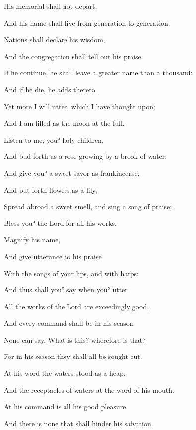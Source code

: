 {\par }{\Q His memorial shall not depart,
\par }{\Q And his name shall live from generation to generation.
\par }{\Q {}Nations shall declare his wisdom,
\par }{\Q And the congregation shall tell out his praise.
\par }{\Q {}If he continue, he shall leave a greater name than a thousand:
\par }{\Q And if he
 die, he adds thereto.
\par }{\BB \par }{\Q {}Yet more I will utter, which I have thought upon;
\par }{\Q And I am filled as the moon at the full.
\par }{\Q {}Listen to me, you° holy children,
\par }{\Q And bud forth as a rose growing by a brook of water:
\par }{\Q {}And give you° a sweet savor as frankincense,
\par }{\Q And put forth flowers as a lily,
\par }{\Q Spread abroad a sweet smell, and sing a song of praise;
\par }{\Q Bless you° the Lord for all his works.
\par }{\Q {}Magnify his name,
\par }{\Q And give utterance to his praise
\par }{\Q With the songs of your lips, and with harps;
\par }{\Q And thus shall you° say when you° utter
{}
\par }{\BB \par }{\Q {}All the works of the Lord are exceedingly good,
\par }{\Q And every command shall be
{} in his season.
\par }{\Q {}None can say, What is this? wherefore is that?
\par }{\Q For in his season they shall all be sought out.
\par }{\Q At his word the waters stood as a heap,
\par }{\Q And the receptacles of waters at the word of his mouth.
\par }{\Q {}At his command is all his good pleasure
{}
\par }{\Q And there is none that shall hinder his salvation.
}
